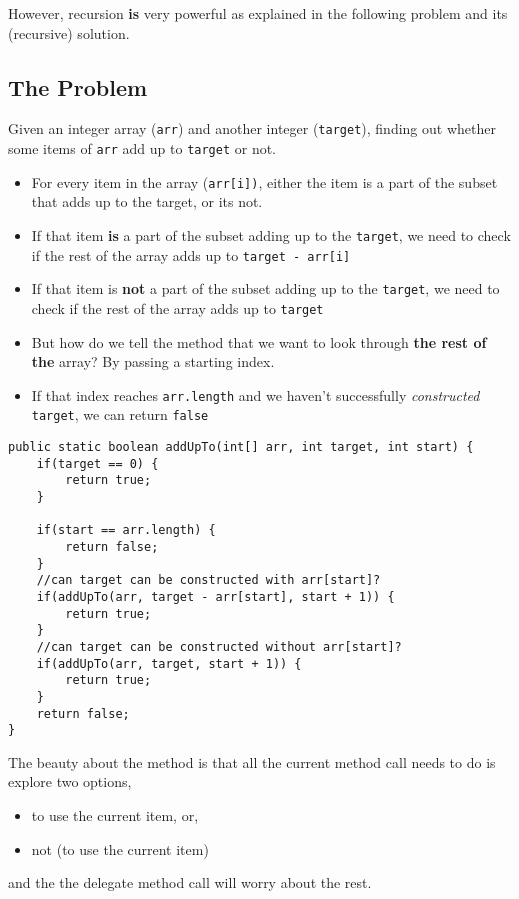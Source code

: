 However, recursion \textbf{is} very powerful as explained in the following problem and its (recursive) solution.


\subsection{The Problem}

Given an integer array (\texttt{arr}) and another integer (\texttt{target}), finding out whether some items of \texttt{arr} add up to \texttt{target} or not.

\begin{itemize}
  \item For every item in the array (\texttt{arr[i])}, either the item is a part of the subset that adds up to the target, or its not.
  \item If that item \textbf{is} a part of the subset adding up to the \texttt{target}, we need to check if the rest of the array adds up to \texttt{target - arr[i]}
  \item If that item is \textbf{not} a part of the subset adding up to the \texttt{target}, we need to check if the rest of the array adds up to \texttt{target}
  \item But how do we tell the method that we want to look through \textbf{the rest of the} array? By passing a starting index.
  \item If that index reaches \texttt{arr.length} and we haven't successfully \textit{constructed} \texttt{target}, we can return \texttt{false}
\end{itemize}

\newpage

\begin{lstlisting}
public static boolean addUpTo(int[] arr, int target, int start) {
	if(target == 0) {
		return true;
	}
	
	if(start == arr.length) {
		return false;
	}
	//can target can be constructed with arr[start]?
	if(addUpTo(arr, target - arr[start], start + 1)) {
		return true;
	}
	//can target can be constructed without arr[start]?
	if(addUpTo(arr, target, start + 1)) {
		return true;
	}
	return false;
}
\end{lstlisting}

The beauty about the method is that all the current method call needs to do is explore two options, 

\begin{itemize}
  \item to use the current item, or,
  \item not (to use the current item)
\end{itemize}

and the the delegate method call will worry about the rest.


